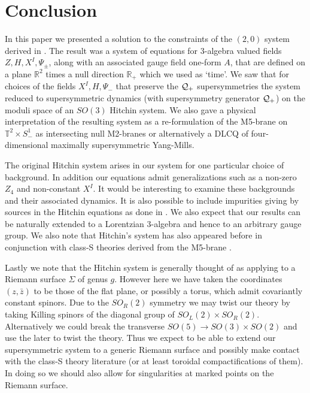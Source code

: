 \documentclass[12pt]{article}
\numberwithin{equation}{section}
\begin{document}
\section{Conclusion}

In this paper we presented a solution to the constraints of the $(2,0)$ system derived in \cite{Lambert:2016xbs}. The result was a system of equations for 3-algebra valued fields $Z,H,X^I,\Psi_\pm$, along with an associated gauge field one-form $A$, that are defined on a plane ${\mathbb R}^2$ times a null direction ${\mathbb R}_+$ which we used as `time'. We saw that for  choices of the fields $X^I,H,\Psi_-$ that preserve the ${\cal Q}_+$ supersymmetries the system reduced to  supersymmetric dynamics (with supersymmetry generator ${\cal Q}_+$) on the moduli space of an $SO(3)$ Hitchin system.
We also gave a physical interpretation of the resulting system as a re-formulation of the M5-brane on ${\mathbb T^2}\times S^1_-$ as  intersecting null M2-branes or alternatively a DLCQ of four-dimensional maximally supersymmetric Yang-Mills.

The original Hitchin system arises in our system for one particular choice of background. In addition our equations   admit generalizations such as a non-zero $Z_4$ and non-constant $X^I$. It would be interesting to examine these backgrounds and their associated dynamics. It is also possible to include impurities giving by sources in the Hitchin equations as done in \cite{Ganor:1997jx,Kapustin:1998pb}. We also expect that our results can be naturally extended to a Lorentzian 3-algebra and hence to an arbitrary gauge group. We also note that  Hitchin's system has also appeared before in conjunction with class-S theories derived from the M5-brane \cite{Gaiotto:2009hg,Yonekura:2013mya,Wang:2015mra,Xie:2014pua,Neitzke:2014cja}.

Lastly we note that the Hitchin system is generally thought of as applying to  a Riemann surface $\Sigma$ of genus $g$. However here we have taken the coordinates $(z,\bar z)$ to be those of the  flat plane, or possibly a torus, which admit covariantly constant spinors. Due to the $SO_R(2)$ symmetry we may twist our theory   by taking Killing spinors of the diagonal group of $SO_L(2)\times SO_R(2)$.  Alternatively we could break the transverse $SO(5)\to SO(3)\times SO(2)$ and use the later to twist the theory. Thus we expect to be able to extend our supersymmetric system to a generic Riemann surface and possibly make contact with the class-S theory literature (or at least toroidal compactifications of them). In doing so we should also allow for singularities   at marked points on the Riemann surface.     
\end{document}
